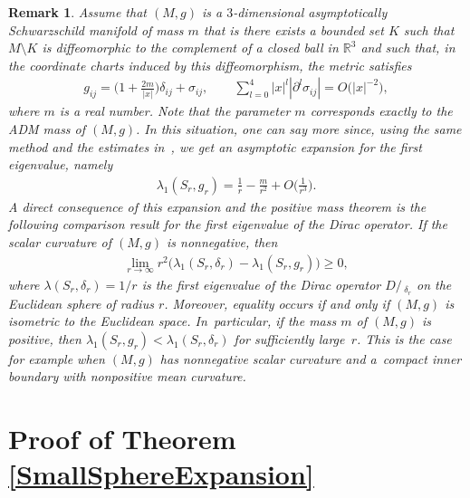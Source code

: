 \documentclass[10pt,a4paper]{amsart}
\numberwithin{equation}{section}
\newtheorem{Remark}[Theorem]{Remark}
\def\D{D\!\!\!\!/\,}
\begin{document}
\begin{Remark}
Assume that $(M,g)$ is a $3$-dimensional asymptotically Schwarzschild manifold of mass $m$ that is there exists a bounded set $K$ such that $M\setminus K$ is diffeomorphic to the complement of a closed ball in $\mathbb{R}^3$ and such that, in the coordinate charts induced by this diffeomorphism, the metric satisfies
\begin{gather*}
g_{ij}=\bigg(1+\frac{2m}{|x|}\bigg)\delta_{ij}+\sigma_{ij},\qquad \sum_{l=0}^4|x|^{l}|\partial^l\sigma_{ij}|=O\big(|x|^{-2}\big),
\end{gather*}
where $m$ is a real number. Note that the parameter $m$ corresponds exactly to the ADM mass of $(M,g)$. In this situation, one can say more since, using the same method and the estimates in~\cite[Section 5]{ShiTam1}, we get an asymptotic expansion for the first eigenvalue, namely
\begin{gather*}%
\lambda_1(S_r,g_r)=\frac{1}{r}-\frac{m}{r^2}+O\bigg(\frac{1}{r^3}\bigg).
\end{gather*}
A direct consequence of this expansion and the positive mass theorem is the following comparison result for the first eigenvalue of the Dirac operator. If the scalar curvature of $(M,g)$ is nonnegative, then
\begin{gather*}
\lim_{r\rightarrow\infty} r^2\big(\lambda_1(S_r,\delta_r)-\lambda_1(S_r,g_r)\big)\geq 0,
\end{gather*}
where $\lambda(S_r,\delta_r)=1/r$ is the first eigenvalue of the Dirac operator $\D_{\delta_r}$ on the Euclidean sphere of radius $r$. Moreover, equality occurs if and only if $(M,g)$ is isometric to the Euclidean space. In~particular, if the mass $m$ of $(M,g)$ is positive, then $\lambda_1(S_r,g_r)<\lambda_1(S_r,\delta_r)$ for sufficiently large~$r$. This is the case for example when $(M,g)$ has nonnegative scalar curvature and a~compact inner boundary with nonpositive mean curvature.
\end{Remark}

\section{Proof of Theorem \ref{SmallSphereExpansion}}\label{SmallSphereLimit}
\end{document}
